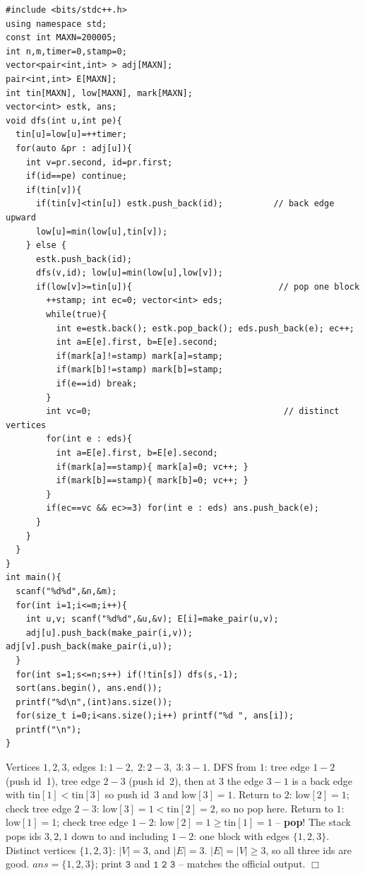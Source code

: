 \begin{lstlisting}[caption={CF 962F. Edge-stack biconnected components; a block is a lone simple cycle iff its edge count equals its distinct-vertex count. A visit stamp counts distinct vertices in linear time. ASCII only, identifiers without underscores}, label={lst:c31-cycles}]
#include <bits/stdc++.h>
using namespace std;
const int MAXN=200005;
int n,m,timer=0,stamp=0;
vector<pair<int,int> > adj[MAXN];
pair<int,int> E[MAXN];
int tin[MAXN], low[MAXN], mark[MAXN];
vector<int> estk, ans;
void dfs(int u,int pe){
  tin[u]=low[u]=++timer;
  for(auto &pr : adj[u]){
    int v=pr.second, id=pr.first;
    if(id==pe) continue;
    if(tin[v]){
      if(tin[v]<tin[u]) estk.push_back(id);          // back edge upward
      low[u]=min(low[u],tin[v]);
    } else {
      estk.push_back(id);
      dfs(v,id); low[u]=min(low[u],low[v]);
      if(low[v]>=tin[u]){                             // pop one block
        ++stamp; int ec=0; vector<int> eds;
        while(true){
          int e=estk.back(); estk.pop_back(); eds.push_back(e); ec++;
          int a=E[e].first, b=E[e].second;
          if(mark[a]!=stamp) mark[a]=stamp;
          if(mark[b]!=stamp) mark[b]=stamp;
          if(e==id) break;
        }
        int vc=0;                                      // distinct vertices
        for(int e : eds){
          int a=E[e].first, b=E[e].second;
          if(mark[a]==stamp){ mark[a]=0; vc++; }
          if(mark[b]==stamp){ mark[b]=0; vc++; }
        }
        if(ec==vc && ec>=3) for(int e : eds) ans.push_back(e);
      }
    }
  }
}
int main(){
  scanf("%d%d",&n,&m);
  for(int i=1;i<=m;i++){
    int u,v; scanf("%d%d",&u,&v); E[i]=make_pair(u,v);
    adj[u].push_back(make_pair(i,v)); adj[v].push_back(make_pair(i,u));
  }
  for(int s=1;s<=n;s++) if(!tin[s]) dfs(s,-1);
  sort(ans.begin(), ans.end());
  printf("%d\n",(int)ans.size());
  for(size_t i=0;i<ans.size();i++) printf("%d ", ans[i]);
  printf("\n");
}
\end{lstlisting}

\begin{tracebox}
Vertices \(1,2,3\), edges \(1\!:\!1\!-\!2,\;2\!:\!2\!-\!3,\;3\!:\!3\!-\!1\).  DFS from
\(1\): tree edge \(1\!-\!2\) (push id~1), tree edge \(2\!-\!3\) (push id~2), then at
\(3\) the edge \(3\!-\!1\) is a back edge with \(\mathrm{tin}[1]<\mathrm{tin}[3]\) so
push id~3 and \(\mathrm{low}[3]=1\).  Return to \(2\): \(\mathrm{low}[2]=1\); check tree
edge \(2\!-\!3\): \(\mathrm{low}[3]=1<\mathrm{tin}[2]=2\), so no pop here.  Return to
\(1\): \(\mathrm{low}[1]=1\); check tree edge \(1\!-\!2\): \(\mathrm{low}[2]=1\ge\mathrm{tin}[1]=1\)
-- \textbf{pop}!  The stack pops ids \(3,2,1\) down to and including \(1\!-\!2\): one
block with edges \(\{1,2,3\}\).  Distinct vertices \(\{1,2,3\}\): \(|V|=3\), and
\(|E|=3\).  \(|E|=|V|\ge3\), so all three ids are good.  \(\mathit{ans}=\{1,2,3\}\);
print \(\boxed{\texttt{3}}\) and \(\boxed{\texttt{1 2 3}}\) -- matches the official output.
\(\Box\)
\end{tracebox}


